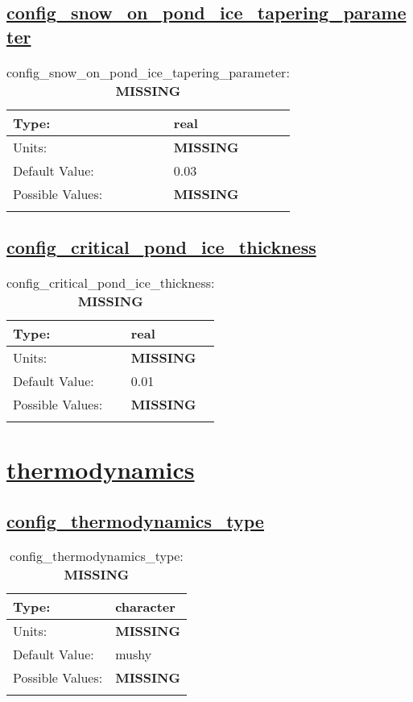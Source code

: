 \subsection[config\_snow\_on\_pond\_ice\_tapering\_parameter]{\hyperref[sec:nm_tab_meltponds]{config\_snow\_on\_pond\_ice\_tapering\_parameter}}
\label{subsec:nm_sec_config_snow_on_pond_ice_tapering_parameter}
\begin{center}
\begin{longtable}{| p{2.0in} || p{4.0in} |}
    \hline
    Type: & real \\
    \hline
    Units: & {\bf \color{red} MISSING} \\
    \hline
    Default Value: & 0.03 \\
    \hline
    Possible Values: & {\bf \color{red} MISSING} \\
    \hline
    \caption{config\_snow\_on\_pond\_ice\_tapering\_parameter: {\bf \color{red} MISSING}}
\end{longtable}
\end{center}
\subsection[config\_critical\_pond\_ice\_thickness]{\hyperref[sec:nm_tab_meltponds]{config\_critical\_pond\_ice\_thickness}}
\label{subsec:nm_sec_config_critical_pond_ice_thickness}
\begin{center}
\begin{longtable}{| p{2.0in} || p{4.0in} |}
    \hline
    Type: & real \\
    \hline
    Units: & {\bf \color{red} MISSING} \\
    \hline
    Default Value: & 0.01 \\
    \hline
    Possible Values: & {\bf \color{red} MISSING} \\
    \hline
    \caption{config\_critical\_pond\_ice\_thickness: {\bf \color{red} MISSING}}
\end{longtable}
\end{center}
\section[thermodynamics]{\hyperref[sec:nm_tab_thermodynamics]{thermodynamics}}
\label{sec:nm_sec_thermodynamics}
\subsection[config\_thermodynamics\_type]{\hyperref[sec:nm_tab_thermodynamics]{config\_thermodynamics\_type}}
\label{subsec:nm_sec_config_thermodynamics_type}
\begin{center}
\begin{longtable}{| p{2.0in} || p{4.0in} |}
    \hline
    Type: & character \\
    \hline
    Units: & {\bf \color{red} MISSING} \\
    \hline
    Default Value: & mushy \\
    \hline
    Possible Values: & {\bf \color{red} MISSING} \\
    \hline
    \caption{config\_thermodynamics\_type: {\bf \color{red} MISSING}}
\end{longtable}
\end{center}
